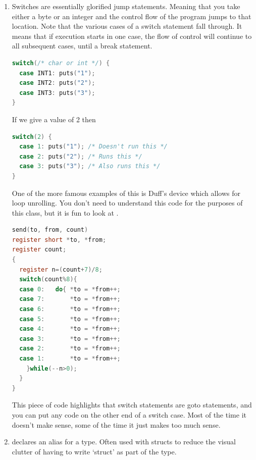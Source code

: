 \begin{enumerate}
\begin{lstlisting}[language=C]
// You can use static initialization in later versions of c
struct hostname google = {"80", "www.google.com", "/"};
\end{lstlisting}


	    \item {} Switches are essentially glorified jump statements.
        Meaning that you take either a byte or an integer and the control flow of the program jumps to that location.
        Note that the various cases of a switch statement fall through. It means that if execution starts in one case, the flow of control will continue to all subsequent cases, until a break statement.
	      \\
	      \begin{lstlisting}[language=C]
switch(/* char or int */) {
  case INT1: puts("1");
  case INT2: puts("2");
  case INT3: puts("3");
}
\end{lstlisting}

	      If we give a value of 2 then
	      \\
	      \begin{lstlisting}[language=C]
switch(2) {
  case 1: puts("1"); /* Doesn't run this */
  case 2: puts("2"); /* Runs this */
  case 3: puts("3"); /* Also runs this */
}
\end{lstlisting}

        One of the more famous examples of this is Duff's device which allows for loop unrolling. You don't need to understand this code for the purposes of this class, but it is fun to look at \cite{duff}.

        \begin{lstlisting}[language=C]
send(to, from, count)
register short *to, *from;
register count;
{
  register n=(count+7)/8;
  switch(count%8){
  case 0:	do{	*to = *from++;
  case 7:		*to = *from++;
  case 6:		*to = *from++;
  case 5:		*to = *from++;
  case 4:		*to = *from++;
  case 3:		*to = *from++;
  case 2:		*to = *from++;
  case 1:		*to = *from++;
    }while(--n>0);
  }
}
\end{lstlisting}
        This piece of code highlights that switch statements are goto statements, and you can put any code on the other end of a switch case.
        Most of the time it doesn't make sense, some of the time it just makes too much sense.

	    \item {} declares an alias for a type.
        Often used with structs to reduce the visual clutter of having to write `struct' as part of the type.


\end{enumerate}
